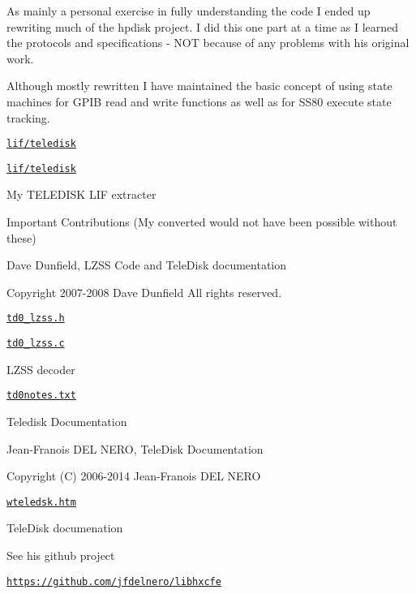 As mainly a personal exercise in fully understanding the code I ended up rewriting much of the hpdisk project. I did this one part at a time as I learned the protocols and specifications -\/ N\+OT because of any problems with his original work.

Although mostly rewritten I have maintained the basic concept of using state machines for G\+P\+IB read and write functions as well as for S\+S80 execute state tracking.

\href{lif/teledisk}{\tt lif/teledisk}
\begin{DoxyItemize}
\item \href{lif/teledisk}{\tt lif/teledisk}
\begin{DoxyItemize}
\item My T\+E\+L\+E\+D\+I\+SK L\+IF extracter
\item Important Contributions (My converted would not have been possible without these)
\begin{DoxyItemize}
\item Dave Dunfield, L\+Z\+SS Code and Tele\+Disk documentation
\begin{DoxyItemize}
\item Copyright 2007-\/2008 Dave Dunfield All rights reserved.
\item \href{lif/teledisk/td0_lzss.h}{\tt td0\+\_\+lzss.\+h}
\item \href{lif/teledisk/td0_lzss.c}{\tt td0\+\_\+lzss.\+c}
\begin{DoxyItemize}
\item L\+Z\+SS decoder
\end{DoxyItemize}
\item \href{lif/teledisk/td0notes.txt}{\tt td0notes.\+txt}
\begin{DoxyItemize}
\item Teledisk Documentation
\end{DoxyItemize}
\end{DoxyItemize}
\item Jean-\/\+Franois D\+EL N\+E\+RO, Tele\+Disk Documentation
\begin{DoxyItemize}
\item Copyright (C) 2006-\/2014 Jean-\/\+Franois D\+EL N\+E\+RO
\begin{DoxyItemize}
\item \href{lif/teledisk/wteledsk.htm}{\tt wteledsk.\+htm}
\begin{DoxyItemize}
\item Tele\+Disk documenation
\end{DoxyItemize}
\item See his github project
\begin{DoxyItemize}
\item \href{https://github.com/jfdelnero/libhxcfe}{\tt https\+://github.\+com/jfdelnero/libhxcfe} 


\end{DoxyItemize}
\end{DoxyItemize}
\end{DoxyItemize}
\end{DoxyItemize}
\end{DoxyItemize}
\end{DoxyItemize}

